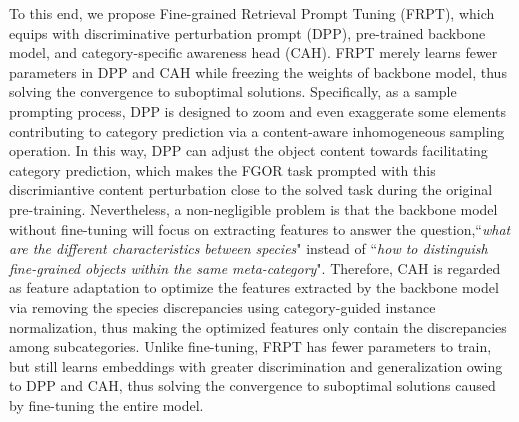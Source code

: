 \documentclass[letterpaper]{article} %
\begin{document}
To this end, we propose Fine-grained Retrieval Prompt Tuning (FRPT), which equips with  discriminative perturbation prompt (DPP), pre-trained backbone model, and category-specific awareness head (CAH).
FRPT merely learns fewer parameters in DPP and CAH while freezing the weights of backbone model, thus solving the convergence to suboptimal solutions.
Specifically, as a sample prompting process, DPP is designed to zoom and even exaggerate some elements contributing to category prediction via a content-aware inhomogeneous sampling operation.
In this way, DPP can adjust the object content towards facilitating category prediction, which makes the FGOR task prompted with this discrimiantive content perturbation close to the solved task during the original pre-training.
Nevertheless, a non-negligible problem is that the backbone model without fine-tuning will focus on extracting features to answer the question,``{\it what are the different characteristics between species}" instead of ``{\it how to distinguish fine-grained objects within the same meta-category}".
Therefore, CAH is regarded as feature adaptation to optimize the features extracted by the backbone model via removing the species discrepancies using category-guided instance normalization, thus making the optimized features only contain the discrepancies among subcategories.
Unlike fine-tuning, FRPT has fewer parameters to train, but still learns embeddings with greater discrimination and generalization owing to DPP and CAH, thus solving the convergence to suboptimal solutions caused by fine-tuning the entire model.

\end{document}
